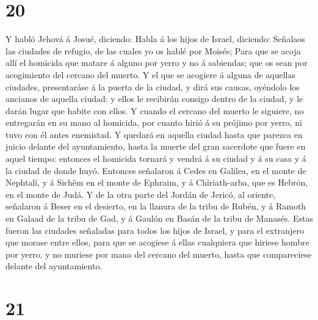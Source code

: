 \hypertarget{section-19}{%
\section{20}\label{section-19}}

 Y habló Jehová á Josué, diciendo:  Habla á los
hijos de Israel, diciendo: Señalaos las ciudades de refugio, de las
cuales yo os hablé por Moisés;  Para que se acoja allí el
homicida que matare á alguno por yerro y no á sabiendas; que os sean por
acogimiento del cercano del muerto.  Y el que se acogiere á
alguna de aquellas ciudades, presentaráse á la puerta de la ciudad, y
dirá sus causas, oyéndolo los ancianos de aquella ciudad: y ellos le
recibirán consigo dentro de la ciudad, y le darán lugar que habite con
ellos.  Y cuando el cercano del muerto le siguiere, no
entregarán en su mano al homicida, por cuanto hirió á su prójimo por
yerro, ni tuvo con él antes enemistad.  Y quedará en aquella
ciudad hasta que parezca en juicio delante del ayuntamiento, hasta la
muerte del gran sacerdote que fuere en aquel tiempo: entonces el
homicida tornará y vendrá á su ciudad y á su casa y á la ciudad de donde
huyó.  Entonces señalaron á Cedes en Galilea, en el monte de
Nephtalí, y á Sichêm en el monte de Ephraim, y á Chîriath-arba, que es
Hebrón, en el monte de Judá.  Y de la otra parte del Jordán
de Jericó, al oriente, señalaron á Beser en el desierto, en la llanura
de la tribu de Rubén, y á Ramoth en Galaad de la tribu de Gad, y á
Gaulón en Basán de la tribu de Manasés.  Estas fueron las
ciudades señaladas para todos los hijos de Israel, y para el extranjero
que morase entre ellos, para que se acogiese á ellas cualquiera que
hiriese hombre por yerro, y no muriese por mano del cercano del muerto,
hasta que compareciese delante del ayuntamiento.

\hypertarget{section-20}{%
\section{21}\label{section-20}}

